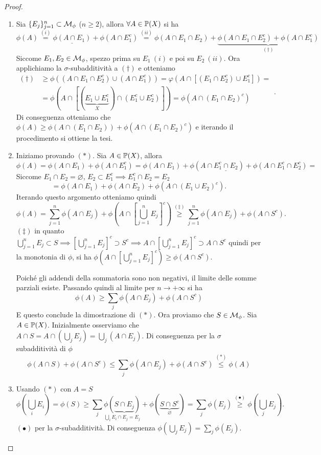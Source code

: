 \begin{proof}

  \begin{enumerate}[label=$(\arabic*)$]
      \item Sia $\{E_j\}_{j=1}^n\subset \M_\phi$ ($n\geq 2$), allora $\forall A\in \P(X)$ si ha
      \[\phi(A)\overset{(i)}=\underline{\phi(A\cap E_1)}+\phi(A\cap E_1^c)\overset{(ii)}=\phi(A\cap E_1\cap E_2)+\underbrace{\phi(A\cap E_1 \cap E_2^c)+\phi(A\cap E_1^c)}_{(\dagger)}\]
      Siccome $E_1, E_2\in \M_\phi$, spezzo prima su $E_1\ (i)$ e poi su $E_2\ (ii)$. Ora applichiamo la $\sigma$-subadditività a $(\dagger)$ e otteniamo
      \[\begin{aligned}(\dagger) & \geq  \phi\left( (A\cap E_1 \cap E_2^c)\cup (A\cap E_1^c) \right)= \varphi(A\cap[(E_1\cap E_2^c)\cup E_1^c]) =\\&= \phi(A\cap [(\underbrace{E_1\cup E_1^c}_X)\cap (E_1^c\cup E_2^c)])= \phi(A\cap(E_1\cap E_2)^c)\end{aligned}.\]
      Di conseguenza otteniamo che $\phi(A)\geq \phi(A\cap (E_1\cap E_2))+\phi(A\cap (E_1\cap E_2)
      ^c)$ e iterando il procedimento si ottiene la tesi.
      \item Iniziamo provando $(*)$. Sia $A\in \P(X)$, allora
      \[\phi(A)=\phi(A\cap E_1)+\phi(A\cap E_1^c)=\phi(A\cap E_1)+\phi(A\cap \underline{E_1^c\cap E_2})+ \phi(A\cap E_1^c\cap E_2^c)=\]
      Siccome $E_1\cap E_2=\varnothing$, $E_2\subset E_1^c \implies E_1^c\cap E_2=E_2$
      \[=\phi(A\cap E_1)+\phi(A\cap E_2)+\phi(A\cap (E_1\cup E_2)^c).\]
      Iterando questo argomento otteniamo quindi 
      \[\phi(A)=\sum_{j=1}^n\phi(A\cap E_j)+\phi\left( A\cap \left[ \bigcup_{j=1}^nE_j \right]^c \right)\overset{(\ddagger)}\geq \sum_{j=1}^n\phi(A\cap E_j)+\phi(A\cap S^c).\]
      $(\ddagger)$ in quanto $\bigcup_{j=1}^n E_j\subset S\implies \left[ \bigcup_{j=1}^n E_j\right]^c \supset S^c \implies A\cap \left[ \bigcup_{j=1}^n E_j\right]^c \supset A\cap S^c$ quindi per la monotonia di $\phi$, si ha $\phi\left( A\cap \left[ \bigcup_{j=1}^n E_j\right]^c\right)\geq \phi(A\cap S^c)$. 

      Poiché gli addendi della sommatoria sono non negativi, il limite delle somme parziali esiste. Passando quindi al limite per $n\to +\infty$ si ha 
      \[\phi(A)\geq \sum_{j}\phi(A\cap E_j)+\phi(A\cap S^c)\]
      E questo conclude la dimostrazione di $(*)$. Ora proviamo che $S\in \M_\phi$. Sia $A\in \P(X)$. Inizialmente osserviamo che $A\cap S = A\cap \left( \bigcup_{j}E_j\right) = \bigcup_j(A\cap E_j)$. Di conseguenza per la $\sigma$ subadditività di $\phi$ 
      \[\phi(A\cap S)+\phi(A\cap S^c)\leq \sum_{j} \phi(A\cap E_j)+\phi(A\cap S^c)\overset{(\ast)}{\leq} \phi(A)\]
      \item Usando $(\ast)$ con $A=S$ 
      \[\phi\left( \bigcup_i E_i\right) = \phi(S) \geq \sum_j\underset{\bigcup_iE_i\cap E_j=E_j}{\phi(\underbrace{S\cap E_j})}+\phi(\underbrace{S\cap S^c}_{\varnothing}) = \sum_j\phi(E_j)\overset{(\bullet)}{\geq} \phi\left( \bigcup _jE_j \right).\]
      $(\bullet)$ per la $\sigma$-subadditività.
      Di conseguenza $\phi\left( \bigcup_jE_j \right)= \sum _j\phi(E_j)$.
  \end{enumerate}
  
\end{proof}


